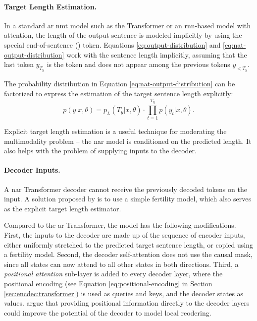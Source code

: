 \paragraph{Target Length Estimation.} In a standard \ac{ar} \ac{nmt} model such
as the Transformer or an \acs{rnn}-based model with attention, the length of
the output sentence is modeled implicitly by using the special end-of-sentence
(\eos{}) token. Equations \ref{eq:output-distribution} and
\ref{eq:nat-output-distribution} work with the sentence length implicitly,
assuming that the last token $y_{T_y}$ is the \eos{} token and does not appear
among the previous tokens $y_{<T_y}$.

The probability distribution in Equation \ref{eq:nat-output-distribution} can
be factorized to express the estimation of the target sentence length
explicitly: %
\begin{equation}
  p(y|x, \theta) = p_L(T_y|x, \theta) \cdot \prod_{t=1}^{T_y}p(y_t|x,\theta).
  \label{eq:explicit-length}
\end{equation}

Explicit target length estimation is a useful technique for moderating the
multimodality problem -- the \ac{nar} model is conditioned on the predicted
length. It also helps with the problem of supplying inputs to the decoder.

\paragraph{Decoder Inputs.} A \acs{nar} Transformer decoder cannot
receive the previously decoded tokens on the input. A solution proposed by
\citet{gu2017nonautoregressive} is to use a simple fertility model, which also
serves as the explicit target length estimator.

Compared to the \acl{ar} Transformer, the model has the following
modifications. First, the inputs to the decoder are made up of the sequence of
encoder inputs, either uniformly stretched to the predicted target sentence
length, or copied using a fertility model. Second, the decoder self-attention
does not use the causal mask, since all states can now attend to all other
states in both directions. Third, a \emph{positional attention} sub-layer is
added to every decoder layer, where the positional encoding (see Equation
\ref{eq:positional-encoding} in Section \ref{sec:encdec:transformer}) is used
as queries and keys, and the decoder states as
values. \citet{gu2017nonautoregressive} argue that providing positional
information directly to the decoder layers could improve the potential of the
decoder to model local reodering.

